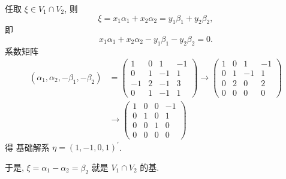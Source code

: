 \documentclass[13pt]{beamer}
\begin{document}
\begin{frame}
 \small{ 任取 $\xi \in V_{1} \cap V_{2}$,   则 
 $$\xi=x_{1} \alpha_{1}+x_{2} \alpha_{2}=y_{1} \beta_{1}+y_{2} \beta_{2},$$  { 即 }
 $$x_{1} \alpha_{1}+x_{2} \alpha_{2}-y_{1} \beta_{1}-y_{2} \beta_{2}=0.$$ 
 系数矩阵 
\begin{align*}
\left(\alpha_{1}, \alpha_{2},-\beta_{1},-\beta_{2}\right)
& =\left(\begin{array}{cc|cc}
1 & 0 & 1 & -1 \\
0 & 1 & -1 & 1 \\
-1 & 2 & -1 & 3 \\
0 & 1 & -1 & 1
\end{array}\right)
 \rightarrow\left(\begin{array}{cc|cc}
1 & 0 & 1 & -1 \\
0 & 1 & -1 & 1 \\
0 & 2 & 0 & 2 \\
0 & 0 & 0 & 0
\end{array}\right)  \\
& \rightarrow\left(\begin{array}{cc|cc}
1 & 0 & 0 & -1 \\
0 & 1 & 0 & 1 \\
0 & 0 & 1 & 0 \\
0 & 0 & 0 & 0
\end{array}\right)
\end{align*}
得 基础解系
$\eta=(1,-1,0,1)^{\prime}$.

于是, $\xi=\alpha_{1}-\alpha_{2}=\beta_{2}$ 就是 
$V_{1} \cap V_{2}$   的基.}
\end{frame}




\end{document}
